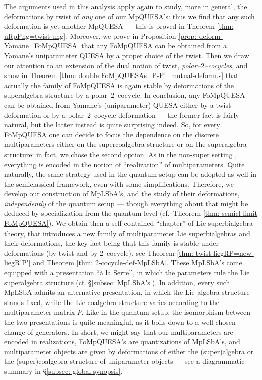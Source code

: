 \documentclass[12pt,reqno,twoside,a4paper]{amsart}
\numberwithin{equation}{section}
\theoremstyle{definition}
\newtheorem{free text}[lema]{}
\theoremstyle{remark}
\theoremstyle{plain}
\begin{document}
The arguments used in this analysis apply again to study, more in general, the deformations by twist of  \textsl{any\/}
one of our MpQUESA's: thus we find that any such deformation is yet another MpQUESA   --- this is proved in  Theorem
\ref{thm: uRpPhg=twist-uhg}.  Moreover, we prove in  Proposition \ref{prop: deform-Yamane=FoMpQUESA}  that any FoMpQUESA
can be obtained from a Yamane's uniparameter QUESA by a proper choice of the twist.  Then we draw our attention to an extension of the dual notion of twist,  \emph{polar--$2$--cocycles},  and show in  Theorem \ref{thm: double FoMpQUESAs_P-P'_mutual-deform.s}  that actually the family of FoMpQUESA is again stable by deformations of the superalgebra structure by a  polar--$2$--cocycle.  In conclusion, any FoMpQUESA can be obtained from Yamane's (uniparameter) QUESA either by a twist deformation
%
%
 or by a  polar--$2$--cocycle  deformation   --- the former fact is fairly natural, but the latter instead is quite surprising indeed.  So, for every FoMpQUESA one can decide
%
 to focus the dependence on the discrete multiparameters either on the supercoalgebra structure or on the superalgebra structure: in fact, we chose the second option.  As in the non-super setting  \cite{GG3},  everything is encoded in the notion of ``realization'' of multiparameters.
%
 \vskip5pt
%
   Quite naturally, the same strategy used in the quantum setup can be adopted as well in the semiclassical framework, even with some simplifications.  Therefore, we develop our construction of MpLSbA's, and the study of their deformations,  \textsl{independently\/}  of the quantum setup   --- though everything about that might be deduced by specialization from the quantum level (cf.\  Theorem \ref{thm: semicl-limit FoMpQUESA}).  We obtain then a self-contained ``chapter'' of Lie superbialgebra theory, that introduces a new family of multiparameter Lie superbialgebras
%
%
 and their deformations, the key fact being that this family is stable under deformations (by twist and by 2--cocycle), see  Theorem \ref{thm: twist-liegRP=new-liegR'P'}  and  Theorem \ref{thm: 2-cocycle-def-MpLSbA}.  These MpLSbA's come equipped with a presentation ``\`a la Serre'', in which the parameters rule the Lie superalgebra structure (cf. \S \ref{subsec: MpLSbA's}).  In addition, every such MpLSbA admits an alternative presentation, in which the Lie algebra structure stands fixed, while the Lie coalgebra structure varies according to the multiparameter matrix  $ P $.  Like in the quantum setup, the isomorphism between the two presentations is quite meaningful, as it boils down to a well-chosen change of generators.  In short, we might say that our multiparameters are encoded in realizations, FoMpQUESA's are quantizations of MpLSbA's, and multiparameter objects are given by deformations of either the (super)algebra or the (super)coalgebra structure of uniparameter objects   --- see a diagrammatic summary in  \S \ref{subsec: global synopsis}.
\end{document}
